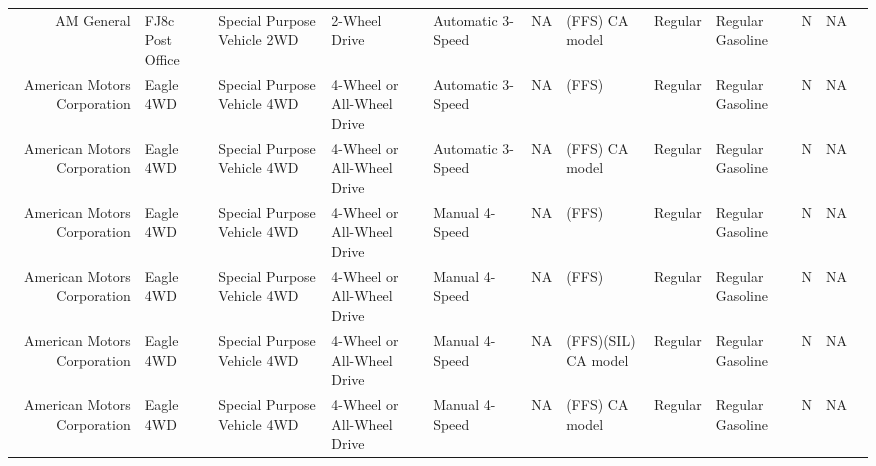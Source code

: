 \documentclass[11pt]{article}
\begin{document}
\begin{tabular}{r|lllllllllll}
	 AM General                  & FJ8c Post Office            & Special Purpose Vehicle 2WD & 2-Wheel Drive               & Automatic 3-Speed           & NA                          & (FFS) CA model              & Regular                     & Regular Gasoline            & N                           & NA                         \\
	 American Motors Corporation & Eagle 4WD                   & Special Purpose Vehicle 4WD & 4-Wheel or All-Wheel Drive  & Automatic 3-Speed           & NA                          & (FFS)                       & Regular                     & Regular Gasoline            & N                           & NA                         \\
	 American Motors Corporation & Eagle 4WD                   & Special Purpose Vehicle 4WD & 4-Wheel or All-Wheel Drive  & Automatic 3-Speed           & NA                          & (FFS) CA model              & Regular                     & Regular Gasoline            & N                           & NA                         \\
	 American Motors Corporation & Eagle 4WD                   & Special Purpose Vehicle 4WD & 4-Wheel or All-Wheel Drive  & Manual 4-Speed              & NA                          & (FFS)                       & Regular                     & Regular Gasoline            & N                           & NA                         \\
	 American Motors Corporation & Eagle 4WD                   & Special Purpose Vehicle 4WD & 4-Wheel or All-Wheel Drive  & Manual 4-Speed              & NA                          & (FFS)                       & Regular                     & Regular Gasoline            & N                           & NA                         \\
	 American Motors Corporation & Eagle 4WD                   & Special Purpose Vehicle 4WD & 4-Wheel or All-Wheel Drive  & Manual 4-Speed              & NA                          & (FFS)(SIL) CA model         & Regular                     & Regular Gasoline            & N                           & NA                         \\
	 American Motors Corporation & Eagle 4WD                   & Special Purpose Vehicle 4WD & 4-Wheel or All-Wheel Drive  & Manual 4-Speed              & NA                          & (FFS) CA model              & Regular                     & Regular Gasoline            & N                           & NA                         \\

\end{tabular}
\end{document}
